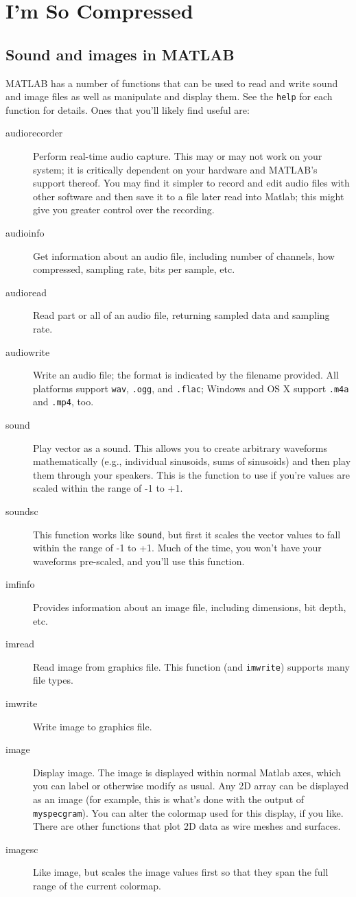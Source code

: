 
\section{I'm So Compressed}

\subsection{Sound and images in MATLAB}

MATLAB has a number of functions that can be used to read and write
sound and image files as well as manipulate and display them. See the
\verb|help| for each function for details. Ones that you'll likely
find useful are:
\begin{description}
\item[audiorecorder] Perform real-time audio capture. This may or may
  not work on your system; it is critically dependent on your hardware
  and MATLAB's support thereof. You may find it simpler to record and
  edit audio files with other software and then save it to a file
  later read into Matlab; this might give you greater control over the
  recording.
\item[audioinfo] Get information about an audio file, including number
  of channels, how compressed, sampling rate, bits per sample, etc.
\item[audioread] Read part or all of an audio file, returning sampled
  data and sampling rate.
\item[audiowrite] Write an audio file; the format is indicated by the
  filename provided. All platforms support \verb|wav|, \verb|.ogg|,
  and \verb|.flac|; Windows and OS X support \verb|.m4a| and
  \verb|.mp4|, too.
\item[sound] Play vector as a sound. This allows you to create
  arbitrary waveforms mathematically (e.g., individual sinusoids, sums
  of sinusoids) and then play them through your speakers. This is the
  function to use if you're values are scaled within the range of -1
  to +1.
\item[soundsc] This function works like \verb|sound|, but first it
  scales the vector values to fall within the range of -1 to +1. Much
  of the time, you won't have your waveforms pre-scaled, and you'll
  use this function.
\item[imfinfo] Provides information about an image file, including
  dimensions, bit depth, etc.
\item[imread] Read image from graphics file. This function (and
  \verb|imwrite|) supports many file types.
\item[imwrite] Write image to graphics file.
\item[image] Display image. The image is displayed within normal
  Matlab axes, which you can label or otherwise modify as usual. Any
  2D array can be displayed as an image (for example, this is what's
  done with the output of \verb|myspecgram|). You can alter the
  colormap used for this display, if you like. There are other
  functions that plot 2D data as wire meshes and surfaces.
\item[imagesc] Like image, but scales the image values first so that
  they span the full range of the current colormap.
\end{description}
